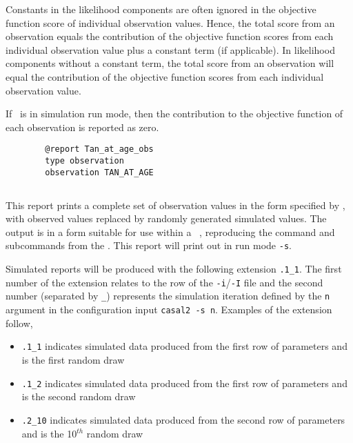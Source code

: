Constants in the likelihood components are often ignored in the objective function score of individual observation values. Hence, the total score from an observation equals the contribution of the objective function scores from each individual observation value plus a constant term (if applicable). In likelihood components without a constant term, the total score from an observation will equal the contribution of the objective function scores from each individual observation value.

If \CNAME\ is in simulation run mode, then the contribution to the objective function of each observation is reported as zero.

\begin{verbatim}
		@report Tan_at_age_obs
		type observation
		observation TAN_AT_AGE
\end{verbatim}

\subsection{}\label{sec:Report-SimulatedObservation}

This report prints a complete set of observation values in the form specified by , with observed values replaced by randomly generated simulated values. The output is in a form  suitable for use within a \CNAME\ \config, reproducing the command and subcommands from the \config. This report will print out in run mode \texttt{-s}.


Simulated reports will be produced with the following extension \texttt{.1\_1}. The first number of the extension relates to the row of the \texttt{-i}/\texttt{-I} file and the second number (separated by \texttt{\_}) represents the simulation iteration defined by the \texttt{n} argument in the configuration input \texttt{casal2 -s n}. Examples of the extension follow,
\begin{itemize}
	\item \texttt{.1\_1} indicates simulated data produced from the first row of parameters and is the first random draw
	\item \texttt{.1\_2} indicates simulated data produced from the first row of parameters and is the second random draw
	\item \texttt{.2\_10} indicates simulated data produced from the second row of parameters and is the 10\(^{th}\) random draw
\end{itemize}

